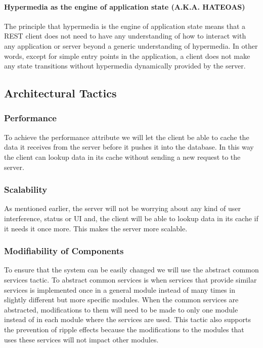 \documentclass[../document.tex]{subfiles}
\begin{document}
\paragraph{Hypermedia as the engine of application state (A.K.A. HATEOAS)}
The principle that hypermedia is the engine of application state means that a REST client does not need to have any understanding of how to interact with any application or server beyond a generic understanding of hypermedia. In other words, except for simple entry points in the application, a client does not make any state transitions without hypermedia dynamically provided by the server. 

\subsection{Architectural Tactics}
\subsubsection{Performance}
To achieve the performance attribute we will let the client be able to cache the data it receives from the server before it pushes it into the database. In this way the client can lookup data in its cache without sending a new request to the server.

\subsubsection{Scalability}
As mentioned earlier, the server will not be worrying about any kind of user interference, status or UI and, the client will be able to lookup data in its cache if it needs it once more. This makes the server more scalable.

\subsubsection{Modifiability of Components}
To ensure that the system can be easily changed we will use the abstract common services tactic. To abstract common services is when services that provide similar services is implemented once in a general module instead of many times in slightly different but more specific modules. When the common services are abstracted, modifications to them will need to be made to only one module instead of in each module where the services are used. This tactic also supports the prevention of ripple effects because the modifications to the modules that uses these services will not impact other modules.
\end{document}
